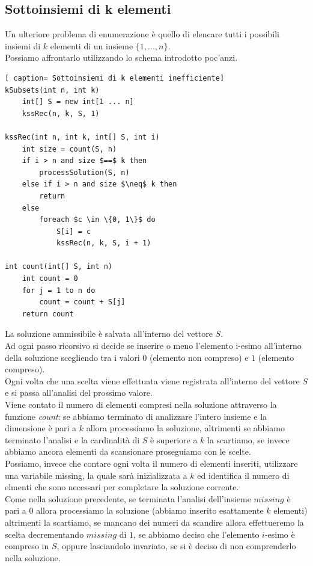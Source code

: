 \documentclass[../cheatSheetAlgoritmi.tex]{subfiles}
\begin{document}
\subsection{Sottoinsiemi di k elementi}
Un ulteriore problema di enumerazione è quello di elencare tutti i possibili insiemi di $k$ elementi di un insieme $\{1, ..., n\}$. \\
Possiamo affrontarlo utilizzando lo schema introdotto poc'anzi.
 \begin{lstlisting}[ caption= Sottoinsiemi di k elementi inefficiente]
kSubsets(int n, int k)
	int[] S = new int[1 ... n]
	kssRec(n, k, S, 1)

kssRec(int n, int k, int[] S, int i)
	int size = count(S, n)
	if i > n and size $==$ k then
		processSolution(S, n)
	else if i > n and size $\neq$ k then
		return 
	else
		foreach $c \in \{0, 1\}$ do
			S[i] = c
			kssRec(n, k, S, i + 1)
			
int count(int[] S, int n)
	int count = 0
	for j = 1 to n do
		count = count + S[j]
	return count
\end{lstlisting}
La soluzione ammissibile è salvata all'interno del vettore $S$. \\
Ad ogni passo ricorsivo si decide se inserire o meno l'elemento i-esimo all'interno della soluzione scegliendo tra i valori $0$ (elemento non compreso) e $1$ (elemento compreso).  \\
Ogni volta che una scelta viene effettuata viene registrata all'interno del vettore $S$ e si passa all'analisi del prossimo valore. \\
Viene contato il numero di elementi compresi nella soluzione attraverso la funzione \emph{count}: se abbiamo terminato di analizzare l'intero insieme e la dimensione è pari a $k$ allora processiamo la soluzione, altrimenti se abbiamo terminato l'analisi e la cardinalità di $S$ è superiore a $k$ la scartiamo, se invece abbiamo ancora elementi da scansionare proseguiamo con le scelte. \\
Possiamo, invece che contare ogni volta il numero di elementi inseriti, utilizzare una variabile missing, la quale sarà inizializzata a $k$ ed identifica il numero di elmenti che sono necessari per completare la soluzione corrente. \\ 
Come nella soluzione precedente, se terminata l'analisi dell'insieme $missing$ è pari a $0$ allora processiamo la soluzione (abbiamo inserito esattamente $k$ elementi) altrimenti la scartiamo, se mancano dei numeri da scandire allora effettueremo la scelta decrementando $missing$ di $1$, se abbiamo deciso che l'elemento $i$-esimo è compreso in $S$, oppure lasciandolo invariato, se si è deciso di non comprenderlo nella soluzione. 
\end{document}
